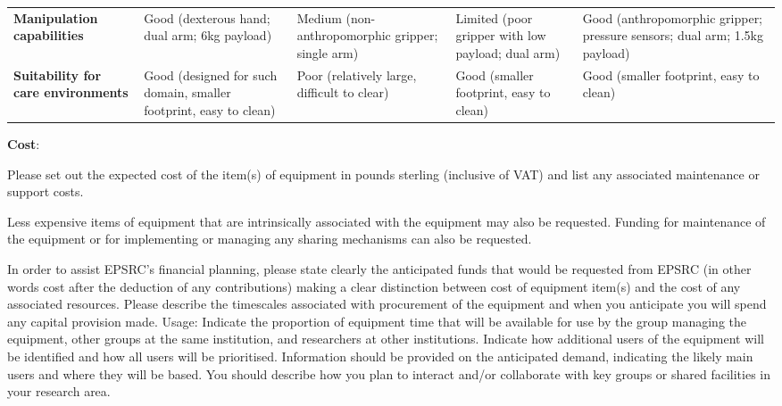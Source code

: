 \begin{table}[h!]
{\begin{tabular}{@{}p{3cm}p{5cm}p{5cm}p{5cm}p{5cm}@{}}
\textbf{Manipulation capabilities}         & Good (dexterous hand; dual arm; 6kg payload)                                                                             & Medium (non-anthropomorphic gripper; single arm)         & Limited (poor gripper with low payload; dual arm)                         & Good (anthropomorphic gripper; pressure sensors; dual arm; 1.5kg payload)                                                                    \\
\textbf{Suitability for care environments} & Good (designed for such domain, smaller footprint, easy to clean)                                                        & Poor (relatively large, difficult to clear)              & Good (smaller footprint, easy to clean)                                   & Good (smaller footprint, easy to clean)                                                                                                      \\ \bottomrule
\end{tabular}
}
    \label{robot-comparison}
\end{table}







\textbf{Cost}: 


Please set out the expected cost of the item(s) of equipment in pounds sterling (inclusive of VAT) and list any associated maintenance or support costs.

Less expensive items of equipment that are intrinsically associated with the equipment may also be requested. Funding for maintenance of the equipment or for implementing or managing any sharing mechanisms can also be requested.

In order to assist EPSRC's financial planning, please state clearly the anticipated funds that would be requested from EPSRC (in other words cost after the deduction of any contributions) making a clear distinction between cost of equipment item(s) and the cost of any associated resources. Please describe the timescales associated with procurement of the equipment and when you anticipate you will spend any capital provision made.
Usage: Indicate the proportion of equipment time that will be available for use by the group managing the equipment, other groups at the same institution, and researchers at other institutions. Indicate how additional users of the equipment will be identified and how all users will be prioritised. Information should be provided on the anticipated demand, indicating the likely main users and where they will be based. You should describe how you plan to interact and/or collaborate with key groups or shared facilities in your research area.

